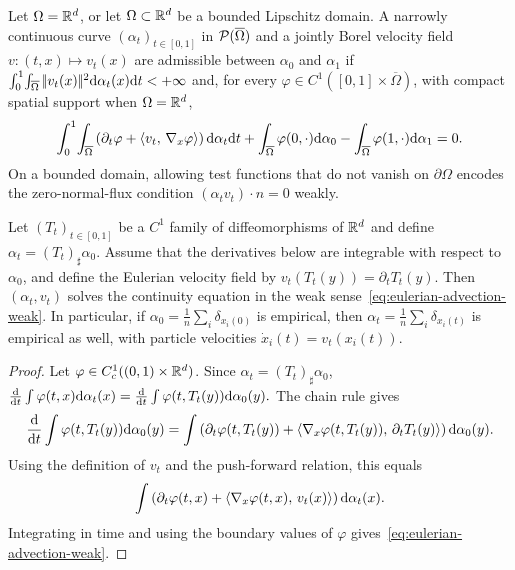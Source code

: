 \begin{defn}\label{def-admissible-continuity-evolution}
Let $\Omega=\mathbb{R}^d$, or let $\Omega\subset\mathbb{R}^d$ be a bounded Lipschitz domain. A narrowly continuous curve $(\alpha_t)_{t\in[0,1]}$ in $\mathcal{P}(\overline\Omega)$ and a jointly Borel velocity field $v:(t,x)\mapsto v_t(x)$ are admissible between $\alpha_0$ and $\alpha_1$ if
\(\int_0^1\!\int_{\overline\Omega}|\!| v_t(x) |\!|^2\mathrm{d}\alpha_t(x)\mathrm{d} t<+\infty\)
and, for every $\varphi\in C^1([0,1]\times\overline\Omega)$, with compact spatial support when $\Omega=\mathbb{R}^d$,
\begin{equation}\label{eq-continuity-endpoint-no-flux}
\int_0^1\!\int_{\overline\Omega}
\left(\partial_t\varphi+\langle v_t,\,\nabla_x\varphi\rangle\right)\mathrm{d}\alpha_t\mathrm{d} t
+\int_{\overline\Omega}\varphi(0,\cdot)\mathrm{d}\alpha_0
-\int_{\overline\Omega}\varphi(1,\cdot)\mathrm{d}\alpha_1=0.
\end{equation}
On a bounded domain, allowing test functions that do not vanish on $\partial\Omega$ encodes the zero-normal-flux condition $(\alpha_t v_t)\cdot n=0$ weakly.
\end{defn}
\begin{prop}\label{prop-lagrangian-flow-continuity}
Let $(T_t)_{t\in[0,1]}$ be a $C^1$ family of diffeomorphisms of $\mathbb{R}^d$ and define $\alpha_t=(T_t)_\sharp\alpha_0$. Assume that the derivatives below are integrable with respect to $\alpha_0$, and define the Eulerian velocity field by
\(v_t(T_t(y))=\partial_t T_t(y).\)
Then $(\alpha_t,v_t)$ solves the continuity equation in the weak sense~\eqref{eq:eulerian-advection-weak}.
In particular, if $\alpha_0=\frac1n\sum_i\delta_{x_i(0)}$ is empirical, then $\alpha_t=\frac1n\sum_i\delta_{x_i(t)}$ is empirical as well, with particle velocities $\dot x_i(t)=v_t(x_i(t))$.
\end{prop}
\begin{proof}
Let $\varphi\in C_c^1((0,1)\times\mathbb{R}^d)$. Since $\alpha_t=(T_t)_\sharp\alpha_0$, \(\frac{\mathrm{d}}{\mathrm{d} t}\int \varphi(t,x)\mathrm{d}\alpha_t(x) = \frac{\mathrm{d}}{\mathrm{d} t}\int \varphi(t,T_t(y))\mathrm{d}\alpha_0(y).\)
The chain rule gives
\[
\frac{\mathrm{d}}{\mathrm{d} t}\int \varphi(t,T_t(y))\mathrm{d}\alpha_0(y)
=
\int
\left(
\partial_t\varphi(t,T_t(y))
+\langle \nabla_x\varphi(t,T_t(y)),\,\partial_t T_t(y)\rangle
\right)
\mathrm{d}\alpha_0(y).
\]
Using the definition of $v_t$ and the push-forward relation, this equals
\[
\int
\left(
\partial_t\varphi(t,x)+\langle \nabla_x\varphi(t,x),\,v_t(x)\rangle
\right)
\mathrm{d}\alpha_t(x).
\]
Integrating in time and using the boundary values of $\varphi$ gives~\eqref{eq:eulerian-advection-weak}.
\end{proof}
